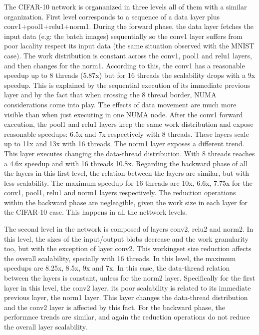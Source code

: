 The CIFAR-10 network is organanized in three levels all of them with a 
similar organization. First level corresponds to a sequence of a data 
layer plus conv1+pool1+relu1+norm1. During the forward phase, the data 
layer fetches the input data (e.g: the batch images) sequentially so 
the conv1 layer suffers from poor lacality respect its input data 
(the same situation observed with the MNIST case). The work distribution 
is constant across the conv1, pool1 and relu1 layers, and then changes 
for the norm1. According to this, the conv1 has a 
reasonable speedup up to 8 threads (5.87x) but for 16 threads the 
scalability drops with a 9x speedup. This is explained by the 
sequential execution of its immediate previous layer and by the fact 
that when crossing the 8 thread border, NUMA considerations come into 
play. The effects of data movement are much more visible than when 
just executing in one NUMA node. After the conv1 forward execution, 
the pool1 and relu1 layers keep the same work distribution and expose 
reasonable speedups: 6.5x and 7x respectively with 8 threads. These 
layers scale up to 11x and 13x with 16 threads. The norm1 layer exposes 
a different trend. This layer executes changing the data-thread 
distribution. With 8 threads reaches a 4.6x speedup and with 
16 threads 10.8x. Regarding the backward phase of all the layers 
in this first level, the relation between the layers are similar, 
but with less scalability. The maximum speedup for 16 threads are 
10x, 6.6x, 7.75x for the conv1, pool1, relu1 and norm1 layers respectively. 
The reduction operations within the backward phase are negleagible, 
given the work size in each layer for the CIFAR-10 case. This happens 
in all the nettwork levels.

The second level in the network is composed of layers conv2, relu2 
and norm2. In this level, the sizes of the input/output blobs decrease 
and the work granularity too, but with the exception of layer conv2. 
This workingset size reduction affects the overall scalability, 
specially with 16 threads. In this level, the maximum speedups are 
8.25x, 8.5x, 9x and 7x. In this case, the data-thread relation between the 
layers is constant, unless for the norm2 layer. Specifically for the 
first layer in this level, the conv2 layer, its poor scalability is 
related to its immediate previous layer, the norm1 layer. This layer 
changes the data-thread distribution and the conv2 layer is affected 
by this fact. For the backward phase, the performnce trends are similar, 
and again the reduction operations do not reduce the overall layer 
scalability.

